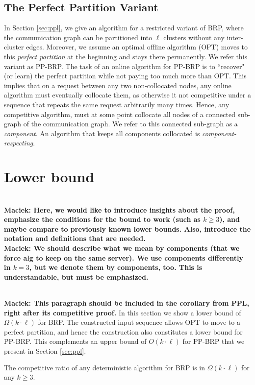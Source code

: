 \documentclass[manuscript,screen=true]{acmart}
\newcommand{\OBRP}{BRP}
\newcommand{\PPOBRP}{PP-BRP}
\newcommand\maciek[1]{\color{brown}\textbf{\\ Maciek: #1}\color{black}}
\begin{document}
\subsection{The Perfect Partition Variant}	\label{sec:PP}
In Section \ref{sec:ppl},
we give an algorithm for a restricted variant of  \OBRP{},
where the communication graph can be partitioned into $\ell$ clusters without any inter-cluster edges.
Moreover, we assume an optimal offline algorithm (OPT) moves to this \emph{perfect partition}
at the beginning and stays there permanently.
We refer this variant as \PPOBRP{}.
The task of an online algorithm for \PPOBRP{} is to ``recover" (or learn) the perfect partition while not paying too much more than OPT.
This implies that on a request between any two non-collocated nodes,
any online algorithm must eventually collocate them,
as otherwise it not competitive under a sequence that repeats the same request arbitrarily many times.
Hence,
any competitive algorithm,
must at some point collocate all nodes of a  connected sub-graph of the communication graph.
We refer to this connected sub-graph as a \emph{component}.
An algorithm that  keeps all components collocated is \emph{component-respecting}.

\section{Lower bound} %
\label{sec:lowerbound}


\maciek{Here, we would like to introduce insights about the proof, emphasize the conditions for the bound to work (such as $k\geq 3$), and maybe compare to previously known lower bounds. Also, introduce the notation and definitions that are needed.}
\maciek{We should describe what we mean by  components (that we force alg to keep on the same server). We use components differently in $k=3$, but we denote them by components, too. This is understandable, but must be emphasized.}

\maciek{This paragraph should be included in the corollary from PPL, right after its competitive proof.}
In this section we show a lower bound of $\Omega(k \cdot \ell)$ for \OBRP{}.
The constructed input sequence allows OPT to move to a perfect partition, and hence
the construction also constitutes a lower bound for \PPOBRP{}.
This complements an upper bound of $O(k \cdot \ell)$
for \PPOBRP{} that we present in Section \ref{sec:ppl}.

\begin{theorem}
	The competitive ratio of any deterministic algorithm for \OBRP{} is in $\Omega(k\cdot \ell)$ for any $k\geq 3$.
\end{theorem}
\end{document}
